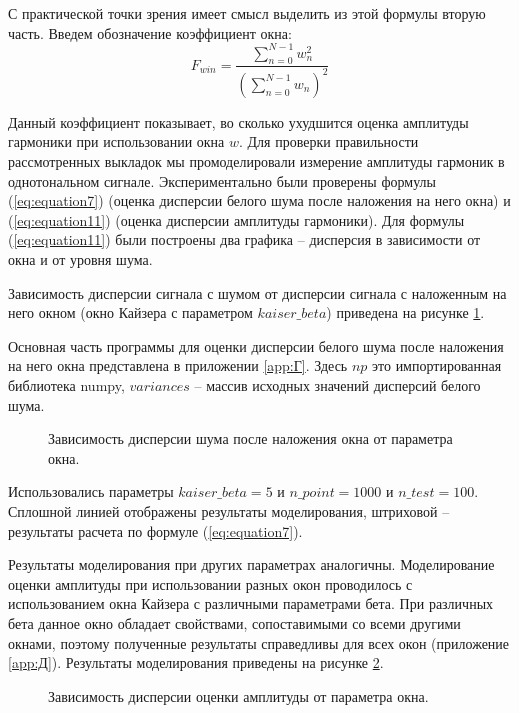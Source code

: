 
С практической точки зрения имеет смысл выделить из этой формулы вторую часть. Введем обозначение коэффициент окна: 
\begin{equation}
	\label{eq:equation12}
	F_{win}=\frac{\sum_{n=0}^{N-1}w_n^2}{\left(\sum_{n=0}^{N-1} w_n\right)^2}
\end{equation}

Данный коэффициент показывает, во сколько ухудшится оценка амплитуды гармоники при использовании окна $w$.
Для проверки правильности рассмотренных выкладок мы промоделировали измерение амплитуды гармоник в однотональном сигнале. Экспериментально были проверены формулы (\ref{eq:equation7}) (оценка дисперсии белого шума после наложения на него окна) и (\ref{eq:equation11}) (оценка дисперсии амплитуды гармоники). Для формулы (\ref{eq:equation11}) были построены два графика -- дисперсия в зависимости от окна и от уровня шума.

Зависимость дисперсии сигнала с шумом от дисперсии сигнала с наложенным на него окном (окно Кайзера с параметром $kaiser\_beta$) приведена на рисунке \ref{img:noise_win_var}.

Основная часть программы для оценки дисперсии белого шума после наложения на него окна представлена в приложении \ref{app:Г}. Здесь $np$ это импортированная библиотека numpy, $variances$ -- массив исходных значений дисперсий белого шума.
\begin{figure}[ht]
	\caption{Зависимость дисперсии шума после наложения окна от параметра окна.}\label{img:noise_win_var}
\end{figure}
Использовались параметры $kaiser\_beta=5$ и $n\_point = 1000$ и $n\_test = 100$.
Сплошной линией отображены результаты моделирования, штриховой -- результаты расчета по формуле (\ref{eq:equation7}).

Результаты моделирования при других параметрах аналогичны. Моделирование оценки амплитуды при использовании разных окон проводилось с использованием окна Кайзера с различными параметрами бета. При различных бета данное окно обладает свойствами, сопоставимыми со всеми другими окнами, поэтому полученные результаты справедливы для всех окон (приложение \ref{app:Д}). 
Результаты моделирования приведены на рисунке \ref{img:estimate_amp_sin_kaiser_beta}. 
\begin{figure}[ht]
	\caption{Зависимость дисперсии оценки амплитуды от параметра окна.}\label{img:estimate_amp_sin_kaiser_beta}
\end{figure}

